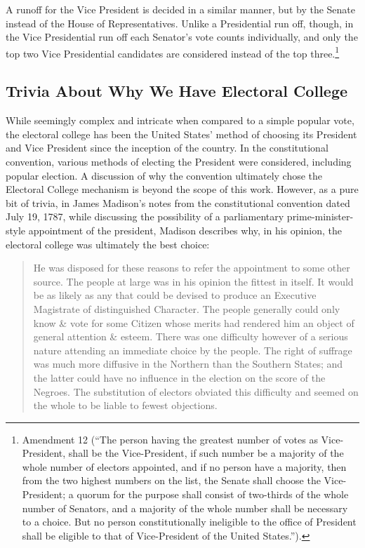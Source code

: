 A runoff for the Vice President is decided in a similar manner, but by the Senate instead of the House of Representatives.  Unlike a Presidential run off, though, in the Vice Presidential run off each Senator's vote counts individually, and only the top two Vice Presidential candidates are considered instead of the top three.\footnote{Amendment 12 (``The person having the greatest number of votes as Vice-President, shall be the Vice-President, if such number be a majority of the whole number of electors appointed, and if no person have a majority, then from the two highest numbers on the list, the Senate shall choose the Vice-President; a quorum for the purpose shall consist of two-thirds of the whole number of Senators, and a majority of the whole number shall be necessary to a choice. But no person constitutionally ineligible to the office of President shall be eligible to that of Vice-President of the United States.'').}

\subsection{Trivia About Why We Have Electoral College}
While seemingly complex and intricate when compared to a simple popular vote, the electoral college has been the United States' method of choosing its President and Vice President since the inception of the country.
In the constitutional convention, various methods of electing the President were considered, including popular election.
A discussion of why the convention ultimately chose the Electoral College mechanism is beyond the scope of this work.  
However, as a pure bit of trivia, in James Madison's notes from the constitutional convention dated July 19, 1787, while discussing the possibility of a parliamentary prime-minister-style appointment of the president, Madison describes why, in his opinion, the electoral college was ultimately the best choice: 
\begin{quote}
He was disposed for these reasons to refer the appointment to some other source. The people at large was in his opinion the fittest in itself.  It would be as likely as any that could be devised to produce an Executive Magistrate of distinguished Character. The people generally could only know \& vote for some Citizen whose merits had rendered him an object of general attention \& esteem. There was one difficulty however of a serious nature attending an immediate choice by the people. The right of suffrage was much more diffusive in the Northern than the Southern States; and the latter could have no influence in the election on the score of the Negroes. The substitution of electors obviated this difficulty and seemed on the whole to be liable to fewest objections.
\end{quote}

